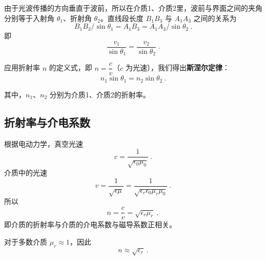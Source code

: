 由于光波传播的方向垂直于波前，所以在介质1、介质2里，波前与界面之间的夹角分别等于入射角 $\theta_1$、折射角 $\theta_2$。直线段长度 $B_{1}B_{3}$ 与 $A_{1}A_{3}$ 之间的关系为
\begin{equation}
B_{1}B_{3}/\sin \theta _{1}=A_{1}B_{3}=A_{1}A_{3}/\sin \theta _{2}~.
\end{equation}
即
\begin{equation}
{\frac  {v_{1}}{\sin \theta _{1}}}={\frac  {v_{2}}{\sin \theta _{2}}}~.
\end{equation}

应用折射率 $n$ 的定义式，即 $n {=}\dfrac{c}{v}$（$c$ 为光速），我们得出\textbf{斯涅尔定律}：
\begin{equation}
n_1\sin\theta_1=n_2\sin\theta_2~.
\end{equation}

其中，$n_{1}$、$n_{2}$ 分别为介质1、介质2的折射率。

\subsection{折射率与介电系数}
根据电动力学，真空光速 
\begin{equation}
c=\frac{1}{\sqrt{\epsilon_0 \mu_0}}~.
\end{equation}
介质中的光速 
\begin{equation}
v=\frac{1}{\sqrt{\epsilon\mu}}=\frac{1}{\sqrt{\epsilon_r \epsilon_0 \mu_r \mu_0}}~.
\end{equation}
所以
\begin{equation}
n=\frac{c}{v}=\sqrt{\epsilon_r \mu_r}~,
\end{equation}
即介质的折射率与介质的介电系数与磁导系数正相关。\cite{GriffE}

对于多数介质 $\mu_r \approx 1$，因此
\begin{equation}
n \approx \sqrt{\epsilon_r}~.
\end{equation}
